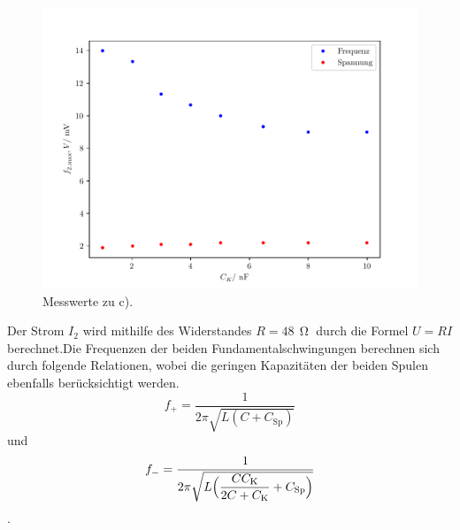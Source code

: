 \begin{figure}[H]
  \centering
  \includegraphics{freq2.pdf}
  \caption{Messwerte zu c).}
  \label{fig:freq2}
\end{figure}

\noindent Der Strom $I_2$ wird mithilfe des Widerstandes $R= 48 \,\upOmega$ durch die Formel $U=RI$ berechnet.Die Frequenzen der 
beiden Fundamentalschwingungen berechnen sich durch folgende Relationen, wobei %
die geringen Kapazitäten der beiden Spulen ebenfalls berücksichtigt werden.
\begin{equation}
  f_+ = \frac{1}{2\pi\sqrt{L(C + C_\text{Sp})}}
\end{equation} 
und \newline 
\begin{equation}
  f_- = \frac{1}{2\pi\sqrt{L\Bigl(\dfrac{CC_\text{K}}{2C+C_\text{K}} + C_\text{Sp}\Bigr)}}
\end{equation}.  


